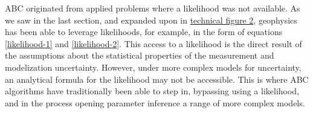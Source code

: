 ABC originated from applied problems where a likelihood was not available. As we saw in the last section, and expanded upon in \hyperref[tf2]{technical figure 2}, geophysics has been able to leverage likelihoods, for example, in the form of equations \ref{likelihood-1} and \ref{likelihood-2}. This access to a likelihood is the direct result of the assumptions about the statistical properties of the measurement and modelization uncertainty. However, under more complex models for uncertainty, an analytical formula for the likelihood may not be accessible. This is where ABC algorithms have traditionally been able to step in, bypassing using a likelihood, and in the process opening parameter inference a range of more complex models. \par


